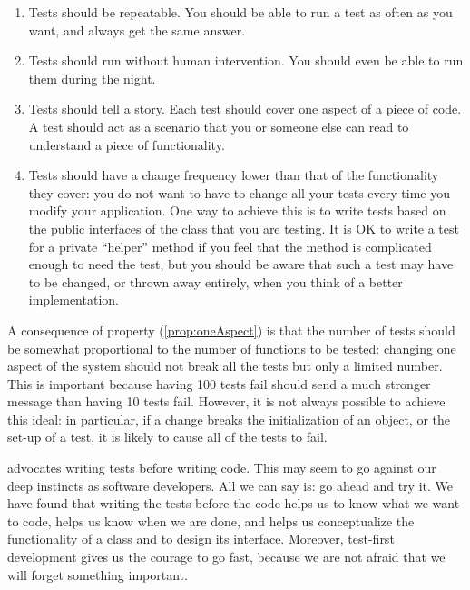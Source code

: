 \documentclass[a4paper,10pt,twoside]{book}
\begin{document}
\begin{enumerate}
\item Tests should be repeatable.  You should be able to run a test
  as often as you want, and always get the same answer.

\item Tests should run without human intervention.  You should even be
  able to run them during the night.

\item Tests should tell a story.  Each test should cover one aspect of a 
  piece of code.  A test should act as a scenario that you or someone else can
  read to understand a piece of functionality. \label{prop:oneAspect}

\item Tests should have a change frequency lower than that of the
  functionality they cover:  you do not want to have to change all your
  tests every time you modify your application.  One way to achieve
  this is to write tests based on the public interfaces of the
  class that you are testing.  
  It is OK to write a test for a private ``helper'' method if you feel that the method
  is complicated enough to need the test, but you should be aware that such a test 
  may have to be changed, or thrown away entirely, when you think of a better
  implementation.
\end{enumerate}

A consequence of property (\ref{prop:oneAspect}) is that 
the number of tests should be somewhat proportional to the number of
functions to be tested: changing one aspect of the
system should not break all the tests but only a limited
number.  This is important because having 100 tests fail should send a
much stronger message than having 10 tests fail.
However, it is not always possible to achieve this ideal: 
in particular, if a change breaks the initialization of an object, or the
set-up of a test, it is likely to cause all of the tests to fail. 

 advocates writing tests before writing code.  This may seem to go
against our deep instincts as software developers.  
All we can say is: go ahead and try it.
We have found that writing the tests before the code helps us
to know what we want to code, helps us know when we are done,
and helps us conceptualize the functionality of a class and to
design its interface.
Moreover, test-first development gives us the courage to go fast, because we are not afraid that we will forget something important.  
\end{document}
